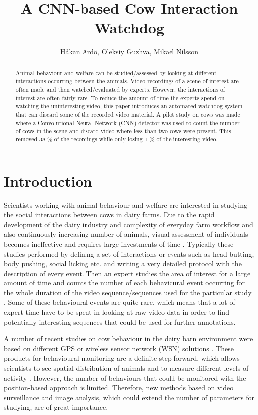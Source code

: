 \documentclass[10pt,a4paper,twocolumn]{article}
\author{Håkan Ardö, Oleksiy Guzhva, Mikael Nilsson}
\title{A CNN-based Cow Interaction Watchdog}
\begin{document}
\maketitle

\begin{abstract}

Animal behaviour and welfare can be studied/assessed by looking at different interactions occurring between the animals. Video recordings of a scene of interest are often made and then watched/evaluated by experts. However, the  interactions of interest are often fairly rare. To reduce the amount of time the experts spend on watching the uninteresting video, this paper introduces an automated watchdog system that can discard some of the recorded video material. A pilot study on cows was made where a Convolutional Neural Network (CNN) detector was used to count the number of cows in the scene and discard video where less than two cows were present. This removed 38 \% of the recordings while only losing 1 \% of the interesting video.


\end{abstract}

\section{Introduction}

Scientists working with animal behaviour and welfare are interested in studying the social interactions between cows in dairy farms. Due to the rapid development of the dairy industry and complexity of everyday farm workflow and also continuously increasing number of animals, visual assessment of individuals becomes ineffective and requires large investments of time \cite{Busseetal2015}. Typically these studies performed by defining a set of interactions or events such as head butting, body pushing, social licking etc. and writing a very detailed protocol with the description of every event. Then an expert studies the area of interest for a large amount of time and counts the number of each behavioural event occurring for the whole duration of the video sequence/sequences used for the particular study \cite{MartinandBateson2007}. Some of these behavioural events are quite rare, which means that a lot of expert time have to be spent in looking at raw video data in order to find potentially interesting sequences that could be used for further annotations.

A number of recent studies on cow behaviour in the dairy barn environment were based on different GPS or wireless sensor network (WSN) solutions \cite{Nadimietal2012}. These products for behavioural monitoring are a definite step forward, which allows scientists to see spatial distribution of animals and to measure different levels of activity \cite{Nadimietal2012}. However, the number of behaviours that could be monitored with the position-based approach is limited. Therefore, new methods based on video surveillance and image analysis, which could extend the number of parameters for studying, are of great importance.
\end{document}
